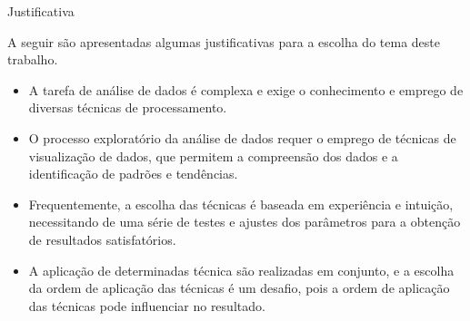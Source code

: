 \begin{frame}{Justificativa}

    A seguir são apresentadas algumas justificativas para a escolha do tema deste trabalho.

    \medskip

    \begin{itemize}
        \item  A tarefa de análise de dados é complexa e exige o conhecimento e emprego de diversas técnicas de processamento.
        \item O processo exploratório da análise de dados requer o emprego de técnicas de visualização de dados, que permitem a compreensão dos dados e a identificação de padrões e tendências.
        \item Frequentemente, a escolha das técnicas é baseada em experiência e intuição, necessitando de uma série de testes e ajustes dos parâmetros para a obtenção de resultados satisfatórios.
        \item A aplicação de determinadas técnica são realizadas em conjunto, e a escolha da ordem de aplicação das técnicas é um desafio, pois a ordem de aplicação das técnicas pode influenciar no resultado.
    \end{itemize}

\end{frame}
